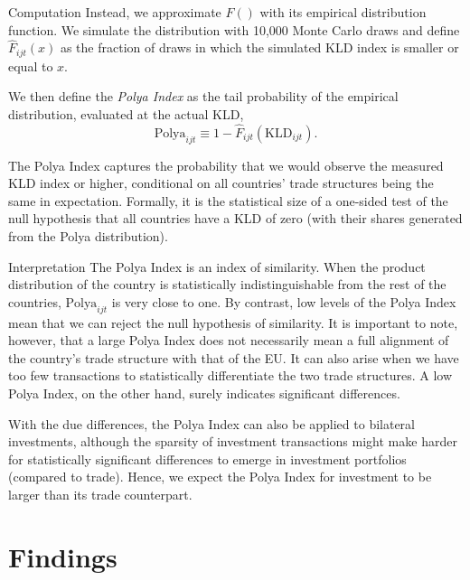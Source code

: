 \documentclass[
  ignorenonframetext,
  aspectratio=16,
]{beamer}
\begin{document}
\begin{frame}{Computation}
\protect\hypertarget{computation}{}
Instead, we approximate \(F()\) with its empirical distribution
function. We simulate the distribution with 10,000 Monte Carlo draws and
define \(\hat F_{ijt}(x)\) as the fraction of draws in which the
simulated KLD index is smaller or equal to \(x\).

We then define the \emph{Polya Index} as the tail probability of the
empirical distribution, evaluated at the actual KLD, \begin{equation}
    \text{Polya}_{ijt} \equiv 1 - \hat F_{ijt}(\text{KLD}_{ijt}).
\end{equation}

The Polya Index captures the probability that we would observe the
measured KLD index or higher, conditional on all countries' trade
structures being the same in expectation. Formally, it is the
statistical size of a one-sided test of the null hypothesis that all
countries have a KLD of zero (with their shares generated from the Polya
distribution).
\end{frame}

\begin{frame}{Interpretation}
\protect\hypertarget{interpretation}{}
The Polya Index is an index of similarity. When the product distribution
of the country is statistically indistinguishable from the rest of the
countries, \(\text{Polya}_{ijt}\) is very close to one. By contrast, low
levels of the Polya Index mean that we can reject the null hypothesis of
similarity. It is important to note, however, that a large Polya Index
does not necessarily mean a full alignment of the country's trade
structure with that of the EU. It can also arise when we have too few
transactions to statistically differentiate the two trade structures. A
low Polya Index, on the other hand, surely indicates significant
differences.

With the due differences, the Polya Index can also be applied to
bilateral investments, although the sparsity of investment transactions
might make harder for statistically significant differences to emerge in
investment portfolios (compared to trade). Hence, we expect the Polya
Index for investment to be larger than its trade counterpart.
\end{frame}

\hypertarget{findings}{%
\section{Findings}\label{findings}}
\end{document}
